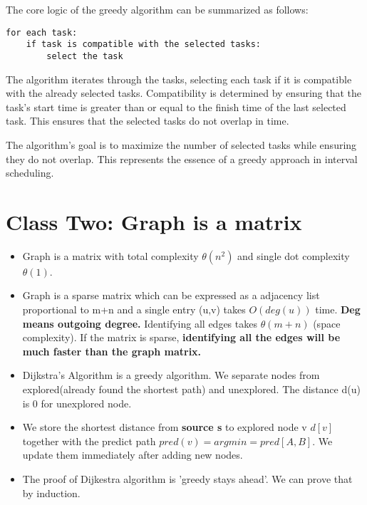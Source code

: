 \documentclass{article}
\begin{document}
The core logic of the greedy algorithm can be summarized as follows:

\begin{verbatim}
for each task:
    if task is compatible with the selected tasks:
        select the task
\end{verbatim}

The algorithm iterates through the tasks, selecting each task if it is compatible with the already selected tasks. Compatibility is determined by ensuring that the task's start time is greater than or equal to the finish time of the last selected task. This ensures that the selected tasks do not overlap in time.

The algorithm's goal is to maximize the number of selected tasks while ensuring they do not overlap. This represents the essence of a greedy approach in interval scheduling.
\section{Class Two: Graph is a matrix}
\begin{itemize}
    \item Graph is a matrix with total complexity $\theta(n^2)$ and single dot complexity $\theta(1)$.
    \item Graph is a sparse matrix which can be expressed as a adjacency list proportional to m+n and a single entry (u,v) takes $O(deg(u))$ time. \textbf{Deg means outgoing degree.} Identifying all edges takes $\theta(m+n)$ (space complexity). If the matrix is sparse, \textbf{identifying all the edges will be much faster than the graph matrix.}
    \item Dijkstra's Algorithm is a greedy algorithm. We separate nodes from explored(already found the shortest path) and unexplored. The distance d(u) is 0 for unexplored node. 
    \item We store the shortest distance from \textbf{source s} to explored node v $d[v]$ together with the predict path $pred(v) = argmin = pred[A,B]$. We update them immediately after adding new nodes.
    \item The proof of Dijkestra algorithm is 'greedy stays ahead'. We can prove that by induction.
\end{itemize}
\end{document}
